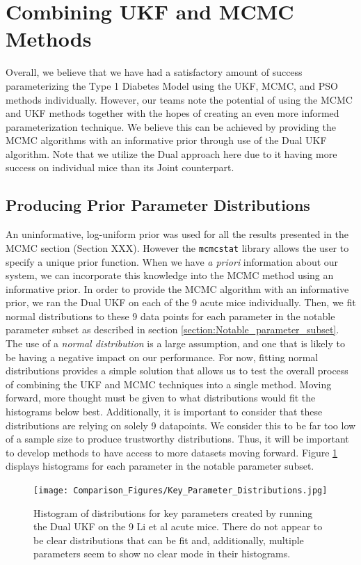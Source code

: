 \documentclass{article}
\begin{document}
\section{Combining UKF and MCMC Methods} \label{section:Combining_UKF_MCMC}
Overall, we believe that we have had a satisfactory amount of success parameterizing the Type 1 Diabetes Model using the UKF, MCMC, and PSO methods individually. However, our teams note the potential of using the MCMC and UKF methods together with the hopes of creating an even more informed parameterization technique. We believe this can be achieved by providing the MCMC algorithms with an informative prior through use of the Dual UKF algorithm. Note that we utilize the Dual approach here due to it having more success on individual mice than its Joint counterpart. 


\subsection{Producing Prior Parameter Distributions}
An uninformative, log-uniform prior was used for all the results presented in the MCMC section (Section XXX). However the \texttt{mcmcstat} library allows the user to specify a unique prior function. When we have \textit{a priori} information about our system, we can incorporate this knowledge into the MCMC method using an informative prior. In order to provide the MCMC algorithm with an informative prior, we ran the Dual UKF on each of the 9 acute mice individually. Then, we fit normal distributions to these 9 data points for each parameter in the notable parameter subset as described in section \ref{section:Notable_parameter_subset}. The use of a \emph{normal distribution} is a large assumption, and one that is likely to be having a negative impact on our performance. For now, fitting normal distributions provides a simple solution that allows us to test the overall process of combining the UKF and MCMC techniques into a single method. Moving forward, more thought must be given to what distributions would fit the histograms below best. Additionally, it is important to consider that these distributions are relying on solely 9 datapoints. We consider this to be far too low of a sample size to produce trustworthy distributions. Thus, it will be important to develop methods to have access to more datasets moving forward. Figure \ref{fig:Discussion_UKFParamDistributions} displays histograms for each parameter in the notable parameter subset.

\begin{figure}[H]
    \centering
    \texttt{[image: Comparison\_Figures/Key\_Parameter\_Distributions.jpg]}
    \caption{Histogram of distributions for key parameters created by running the Dual UKF on the 9 Li et al acute mice. There do not appear to be clear distributions that can be fit and, additionally, multiple parameters seem to show no clear mode in their histograms.}
    \label{fig:Discussion_UKFParamDistributions}
\end{figure}
\end{document}
